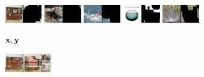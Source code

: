 \newcommand{\imagenetimgheight}{0.8cm}
  \begin{figure}[t]
    \centering
    \begin{subfigure}[t]{0.15\textwidth}
      \centering
      \includegraphics[height=\imagenetimgheight]{figs/cigcvae/image-samples/imagenet64/freeform_aipo_0_gt_masked.png}
      \includegraphics[height=\imagenetimgheight]{figs/cigcvae/image-samples/imagenet64/freeform_aipo_1_gt_masked.png}
      \includegraphics[height=\imagenetimgheight]{figs/cigcvae/image-samples/imagenet64/freeform_aipo_2_gt_masked.png}
      \includegraphics[height=\imagenetimgheight]{figs/cigcvae/image-samples/imagenet64/freeform_aipo_3_gt_masked.png}
      \includegraphics[height=\imagenetimgheight]{figs/cigcvae/image-samples/imagenet64/freeform_aipo_4_gt_masked.png}
      \caption{\scriptsize ${\mathbf{x}}, {\mathbf{y}}$}
    \end{subfigure}
    \begin{subfigure}[t]{0.2\textwidth}
      \centering
      \includegraphics[height=\imagenetimgheight]{figs/cigcvae/image-samples/imagenet64/freeform_aipo_0_t=0.85_samples.png}

\end{subfigure}
\end{figure}
